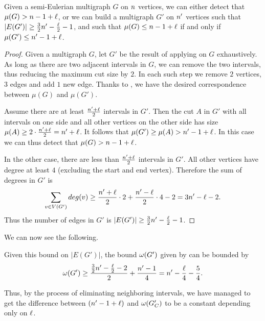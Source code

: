 \documentclass[a4paper,UKenglish,cleveref, thm-restate]{lipics-v2021}
\begin{document}
\begin{lemma}
\label{lem:G'}
Given a semi-Eulerian multigraph $G$ on $\dimension$ vertices, we can either detect that $\mu(G)>\dimension-1+\constB$, or we can build a multigraph $G'$ on $\dimension'$ vertices such that $|E(G')|\geq \frac{3}{2}\dimension'-\frac{\constB}{2}-1$, and such that $\mu(G)\leq \dimension-1+\constB$ if and only if $\mu(G')\leq \dimension'-1+\constB$.
\end{lemma}

\begin{proof}
Given a multigraph $G$,
let $G'$ be the result of applying  on $G$ exhaustively.
As long as there are two adjacent intervals in $G$, we can remove the two intervals, thus reducing the maximum cut size by $2$.
In each such step we remove $2$ vertices, $3$ edges and add $1$ new edge.
Thanks to , we have the desired correspondence between $\mu(G)$ and $\mu(G')$.

Assume there are at least $\frac{\dimension' +\constB}{2}$ intervals in $G'$.
Then the cut $A$ in $G'$ with all intervals on one side and all other vertices on the other side has size $\mu(A) \geq 2 \cdot \frac{\dimension' +\constB}{2} = \dimension'+\constB$. 
It follows that $\mu(G') \geq \mu(A) > \dimension' - 1 + \constB$.
In this case we can thus detect that $\mu(G)> \dimension-1+\constB$.

In the other case, there are less than $\frac{\dimension' +\constB}{2}$ intervals in $G'$.
All other vertices have degree at least $4$ (excluding the start and end vertex).
Therefore the sum of degrees in $G'$ is
\[\sum_{v \in V(G')} deg(v) \geq \frac{\dimension' +\constB}{2} \cdot 2 + \frac{\dimension' -\constB}{2} \cdot 4 -2 
=3 \dimension' -\constB-2.\]
Thus the number of edges in $G'$ is $\abs{E(G')} \geq \frac{3}{2}\dimension' -\frac{\constB}{2} -1$.
\end{proof}

We can now see the following.
\begin{observation}
\label{obs:boundedErdosBound}
Given this bound on $|E(G')|$, the bound $\omega(G')$ given by  can be bounded by 
\[\bound(G')\geq\frac{\frac{3}{2}\dimension'-\frac{\constB}{2}-2}{2}+\frac{\dimension'-1}{4}=\dimension'-\frac{\constB}{4}-\frac{5}{4}.\]
\end{observation}
Thus, by the process of eliminating neighboring intervals, we have managed to get the difference between $(\dimension'-1+\constB)$ and $\bound(G_\Colors')$ to be a constant depending only on $\constB$.
\end{document}
